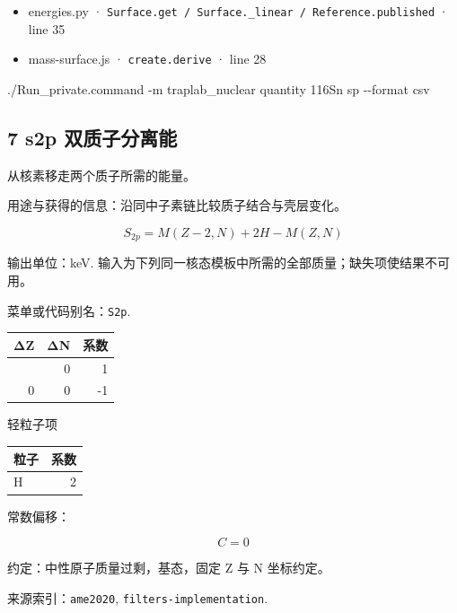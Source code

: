 \documentclass[
  11pt,
  letterpaper,
]{article}
\newenvironment{Shaded}{}{}
\newcommand{\AttributeTok}[1]{\textcolor[rgb]{0.49,0.56,0.16}{#1}}
\newcommand{\ExtensionTok}[1]{#1}
\newcommand{\NormalTok}[1]{#1}
\providecommand{\tightlist}{%
  \setlength{\itemsep}{0pt}\setlength{\parskip}{0pt}}
\begin{document}
\begin{itemize}
\tightlist
\item
  energies.py ·
  \texttt{Surface.get\ /\ Surface.\_linear\ /\ Reference.published} ·
  line 35
\item
  mass-surface.js · \texttt{create.derive} · line 28
\end{itemize}

\begin{Shaded}
\begin{Highlighting}[]
\ExtensionTok{./Run\_private.command} \AttributeTok{{-}m}\NormalTok{ traplab\_nuclear quantity 116Sn sp }\AttributeTok{{-}{-}format}\NormalTok{ csv}
\end{Highlighting}
\end{Shaded}

\subsection{7 s2p
双质子分离能}\label{s2p-ux53ccux8d28ux5b50ux5206ux79bbux80fd}

从核素移走两个质子所需的能量。

用途与获得的信息：沿同中子素链比较质子结合与壳层变化。

\[
S_{2p}=M(Z-2,N)+2H-M(Z,N)
\]

输出单位：keV.
输入为下列同一核态模板中所需的全部质量；缺失项使结果不可用。

菜单或代码别名：\texttt{S2p}.

\begin{longtable}[]{@{}rrr@{}}
\toprule\noalign{}
ΔZ & ΔN & 系数 \\
\midrule\noalign{}
\endhead
\bottomrule\noalign{}
\endlastfoot
-2 & 0 & 1 \\
0 & 0 & -1 \\
\end{longtable}

轻粒子项

\begin{longtable}[]{@{}lr@{}}
\toprule\noalign{}
粒子 & 系数 \\
\midrule\noalign{}
\endhead
\bottomrule\noalign{}
\endlastfoot
H & 2 \\
\end{longtable}

常数偏移：

\[
C=0
\]

约定：中性原子质量过剩，基态，固定 Z 与 N 坐标约定。

来源索引：\texttt{ame2020}, \texttt{filters-implementation}.
\end{document}
